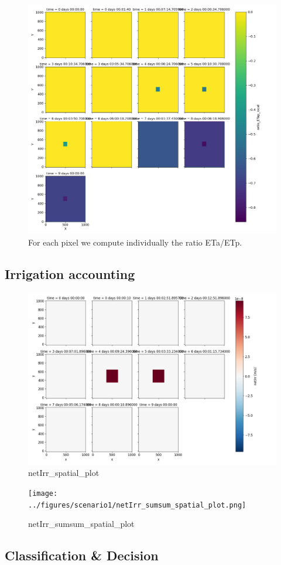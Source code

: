 \documentclass{article}
\begin{document}
\begin{figure}[!htbp]
\centering
\includegraphics[width=0.875\linewidth]{files/ratioETap_withIRR_sp-3ce82098ed713b0f32abaf56fe476a17.png}
\caption*{For each pixel we compute individually the ratio ETa/ETp.}
\end{figure}

\subsection{Irrigation accounting}

\begin{figure}[!htbp]
\centering
\includegraphics[width=0.875\linewidth]{../figures/scenario1/netIrr_spatial_plot.png}
\caption*{netIrr\_spatial\_plot}
\end{figure}

\begin{figure}[!htbp]
\centering
\texttt{[image: ../figures/scenario1/netIrr\_sumsum\_spatial\_plot.png]}
\caption*{netIrr\_sumsum\_spatial\_plot}
\end{figure}

\subsection{Classification \& Decision}
\end{document}
